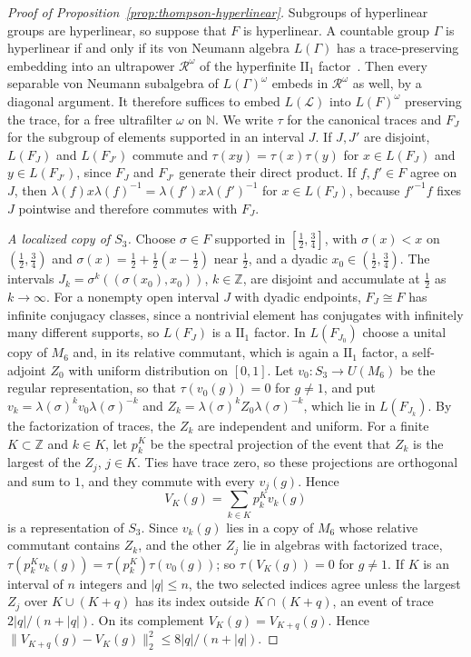 \begin{proof}[Proof of Proposition~\ref{prop:thompson-hyperlinear}]
Subgroups of hyperlinear groups are hyperlinear, so suppose that $F$ is hyperlinear. A countable group $\Gamma$ is hyperlinear if and only if
its von Neumann algebra $L(\Gamma)$ has a trace-preserving embedding into an ultrapower $\mathcal R^\omega$ of the hyperfinite
$\mathrm{II}_1$ factor~\cite{CapraroLupini2015}. Then every separable von Neumann subalgebra of $L(\Gamma)^\omega$ embeds in
$\mathcal R^\omega$ as well, by a diagonal argument. It therefore suffices to embed $L(\mathcal L)$ into $L(F)^\omega$ preserving the trace,
for a free ultrafilter $\omega$ on $\mathbb N$. We write $\tau$ for the canonical traces and $F_J$ for the subgroup of elements supported in an
interval $J$. If $J,J'$ are disjoint, $L(F_J)$ and $L(F_{J'})$ commute and $\tau(xy)=\tau(x)\tau(y)$ for $x\in L(F_J)$ and $y\in L(F_{J'})$,
since $F_J$ and $F_{J'}$ generate their direct product. If $f,f'\in F$ agree on $J$, then $\lambda(f)x\lambda(f)^{-1}=\lambda(f')x\lambda(f')^{-1}$
for $x\in L(F_J)$, because $f'^{-1}f$ fixes $J$ pointwise and therefore commutes with $F_J$.

\emph{A localized copy of $S_3$.} Choose $\sigma\in F$ supported in $[\frac12,\frac34]$, with $\sigma(x)<x$ on $(\frac12,\frac34)$ and
$\sigma(x)=\frac12+\frac12(x-\frac12)$ near $\frac12$, and a dyadic $x_0\in(\frac12,\frac34)$. The intervals
$J_k=\sigma^k((\sigma(x_0),x_0))$, $k\in\mathbb Z$, are disjoint and accumulate at $\frac12$ as $k\to\infty$. For a nonempty open interval $J$ with
dyadic endpoints, $F_J\cong F$ has infinite conjugacy classes, since a nontrivial element has conjugates with infinitely many different
supports, so $L(F_J)$ is a $\mathrm{II}_1$ factor. In $L(F_{J_0})$ choose a unital copy of $M_6$ and, in its relative commutant, which is again a
$\mathrm{II}_1$ factor, a self-adjoint $Z_0$ with uniform distribution on $[0,1]$. Let $v_0:S_3\to U(M_6)$ be the regular representation, so
that $\tau(v_0(g))=0$ for $g\ne1$, and put $v_k=\lambda(\sigma)^kv_0\lambda(\sigma)^{-k}$ and $Z_k=\lambda(\sigma)^kZ_0\lambda(\sigma)^{-k}$,
which lie in $L(F_{J_k})$. By the factorization of traces, the $Z_k$ are independent and uniform. For a finite $K\subset\mathbb Z$ and $k\in K$,
let $p^K_k$ be the spectral projection of the event that $Z_k$ is the largest of the $Z_j$, $j\in K$. Ties have trace zero, so these projections
are orthogonal and sum to $1$, and they commute with every $v_j(g)$. Hence
\[
V_K(g)=\sum_{k\in K}p^K_kv_k(g)
\]
is a representation of $S_3$. Since $v_k(g)$ lies in a copy of $M_6$ whose relative commutant contains $Z_k$, and the other $Z_j$ lie in
algebras with factorized trace, $\tau(p^K_kv_k(g))=\tau(p^K_k)\tau(v_0(g))$; so $\tau(V_K(g))=0$ for $g\ne1$. If $K$ is an interval of $n$ integers and $|q|\le n$,
the two selected indices agree unless the largest $Z_j$ over $K\cup(K+q)$ has its index outside $K\cap(K+q)$, an event of trace
$2|q|/(n+|q|)$. On its complement $V_K(g)=V_{K+q}(g)$. Hence $\|V_{K+q}(g)-V_K(g)\|_2^2\le8|q|/(n+|q|)$.


\end{proof}
